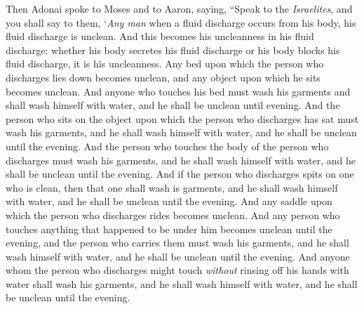 \begin{biblechapter} %
 Then Adonai spoke to Moses and to Aaron, saying,
\verse “Speak to the \textit{Israelites}, and you shall say to them, ‘\textit{Any man} when a fluid discharge occurs from his body, his fluid discharge is unclean.
\verse And this becomes his uncleanness in his fluid discharge: whether his body secretes his fluid discharge or his body blocks his fluid discharge, it is his uncleanness.
\verse Any bed upon which the person who discharges lies down becomes unclean, and any object upon which he sits becomes unclean.
\verse And anyone who touches his bed must wash his garments and shall wash himself with water, and he shall be unclean until evening.
\verse And the person who sits on the object upon which the person who discharges has sat must wash his garments, and he shall wash himself with water, and he shall be unclean until the evening.
\verse And the person who touches the body of the person who discharges must wash his garments, and he shall wash himself with water, and he shall be unclean until the evening.
\verse And if the person who discharges spits on one who is clean, then that one shall wash is garments, and he shall wash himself with water, and he shall be unclean until the evening.
\verse And any saddle upon which the person who discharges rides becomes unclean.
\verse And any person who touches anything that happened to be under him becomes unclean until the evening, and the person who carries them must wash his garments, and he shall wash himself with water, and he shall be unclean until the evening.
\verse And anyone whom the person who discharges might touch \textit{without} rinsing off his hands with water shall wash his garments, and he shall wash himself with water, and he shall be unclean until the evening.

\end{biblechapter}
